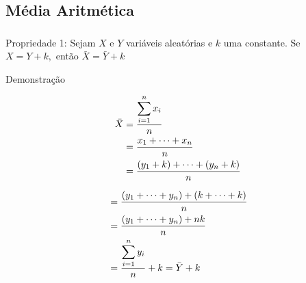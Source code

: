 \documentclass[14pt,aspectratio=1610]{beamer}
\begin{document}
\subsection{Média Aritmética}
\begin{frame}{}
\frametitle{}
\begin{block}{Propriedade 1:}
\justifying
Sejam $X$ e $Y$ variáveis aleatórias e $k$ uma constante. Se $X=Y+k,$ então $\bar{X}=\bar{Y}+k$
\end{block}
\pause
\begin{block}{Demonstração}
\begin{minipage}{0.4\textwidth}
\begin{align*}
\bar{X}&=\dfrac{{\displaystyle \sum_{i=1}^{n}x_{i}}}{n}\\ 
\vspace{0.1cm}
       &=\dfrac{x_{1}+\cdots+x_{n}}{n}\\ \vspace{0.1cm}
       &=\dfrac{(y_{1}+k)+\cdots+(y_{n}+k)}{n}\\
\end{align*}
\end{minipage}\pause\hfill
\begin{minipage}{0.4\textwidth}
\begin{align*}
&=\dfrac{(y_{1}+\cdots+y_{n})+
(k+\cdots+k)}{n}\\ \vspace{0.1cm}
&=\dfrac{(y_{1}+\cdots+y_{n})+
nk}{n}\\ \vspace{0.1cm}
&=\dfrac{{\displaystyle \sum_{i=1}^{n}y_{i}}}{n}+k=\bar{Y}+k
\end{align*}
\end{minipage}
\end{block}
\end{frame}
\end{document}
